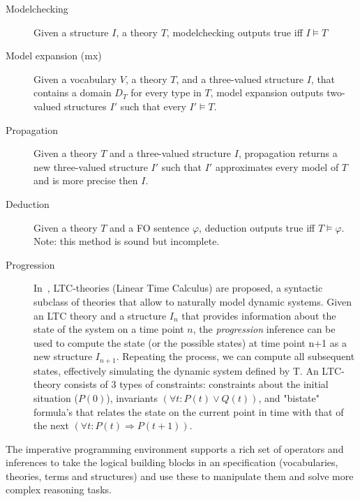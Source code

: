 \documentclass[runningheads]{llncs}
\newcommand{\logicname}[1]{\text{\sc #1}\xspace}
\newcommand{\fodotidp}{\logicname{FO(\ensuremath{\cdot})\ensuremath{^{\mathtt{IDP}}}}}
\newcommand{\fodot}{\logicname{FO(\ensuremath{\cdot})}}
\newcommand{\ignore}[1]{}
\begin{document}
\begin{description}
 \item[Modelchecking] Given a structure $I$, a theory $T$, modelchecking outputs true iff $I\models T$
 \item[Model expansion (mx)] Given a vocabulary $V$, a \fodot theory $T$, and a three-valued structure $I$, that contains a domain $D_T$ for every type in $T$, model expansion outputs two-valued structures $I'$ such that every $I'\models T$.
 \item[Propagation] Given a \fodot theory $T$ and a three-valued structure $I$, propagation returns a new three-valued structure $I'$ such that $I'$ approximates every model of $T$ and is more precise then $I$.
 \item[Deduction] Given a \fodot theory $T$ and a FO sentence $\varphi$, deduction outputs true iff $T\models \varphi$. Note: this method is sound but incomplete.
 \item[Progression] 
 In~\cite{iclp/BogaertsTemp}, LTC-theories (Linear Time Calculus) are proposed, a syntactic subclass of \fodot theories that allow to naturally model dynamic systems. 
 Given an LTC theory and a structure $I_n$ that provides information about the state of the system on a time point $n$, the \emph{progression} inference can be used to compute the state (or the possible states) at time point n+1 as a new structure $I_{n+1}$. 
 Repeating the process, we can compute all subsequent states, effectively simulating the dynamic system defined by T. 
 An LTC-theory consists of 3 types of constraints: constraints about the initial situation ($P(0)$), invariants $(\forall t: P(t) \lor Q(t))$, and "bistate" formula's that relates the state on the current point in time with that of the next $(\forall t: P(t) \Rightarrow P(t+1))$.
\ignore{ A small example is included in listing \ref{progress}, which also contains structure $I_1$ the result of the progression.
 \begin{lstlisting}[caption={A dynamic system: a lamp.},label={progress}]
vocabulary V {
    type Time
    LampOn(Time)
    PushSwitch(Time)
}
theory sp_theory1: sp_voc {
    //Constraints about the initial state
    ~LampOn(0).
    //BiState constraints
    !t:~LampOn(t)&PushSwitch(t)=>LampOn(t+1).
    !t:LampOn(t)&PushSwitch(t)=>~LampOn(t+1).
}
structure I_0 {
    Time=0..5
    LampOn={}
    PushSwitch={0}
}
structure I_1 {
    Time=0..5
    LampOn={1}
    PushSwitch={}
}
\end{lstlisting}}
 
 \end{description}
 The imperative programming environment supports a rich set of operators and inferences to take the logical building blocks in an \fodotidp specification (vocabularies, theories, terms and structures) and use these to manipulate them and solve more complex reasoning tasks.
 
\end{document}
